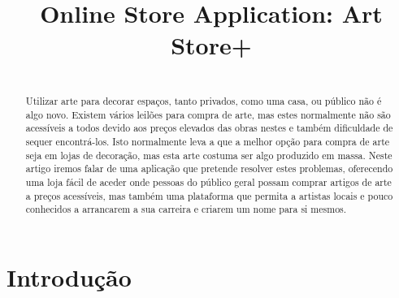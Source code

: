 \documentclass[conference]{IEEEtran}
\begin{document}
\title{Online Store Application: Art Store+}

\author{
\and
{}
\and
{}
}

\maketitle

\begin{abstract}
 \\Utilizar arte para decorar espaços, tanto privados, como uma casa, ou público não é algo novo. Existem vários leilões para compra de arte, mas estes normalmente não são acessíveis a todos devido aos preços elevados das obras nestes e também dificuldade de sequer encontrá-los. Isto normalmente leva a que a melhor opção para compra de arte seja em lojas de decoração, mas esta arte costuma ser algo produzido em massa. Neste artigo iremos falar de uma aplicação que pretende resolver estes problemas, oferecendo uma loja fácil de aceder onde pessoas do público geral possam comprar artigos de arte a preços acessíveis, mas também uma plataforma que permita a artistas locais e pouco conhecidos a arrancarem a sua carreira e criarem um nome para si mesmos.
\end{abstract}

\begin{IEEEkeywords}

\end{IEEEkeywords}

\section{Introdução}
\end{document}

